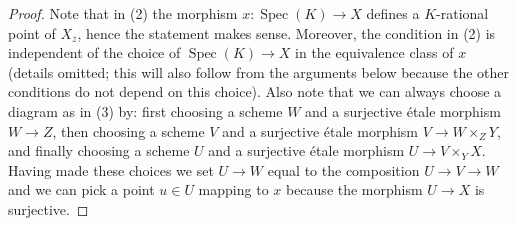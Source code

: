 \documentclass[10pt,a4paper]{amsart}
\theoremstyle{plain}
\theoremstyle{definition}
\theoremstyle{remark}
\numberwithin{equation}{subsection}
\def\Spec{\mathop{\mathrm{Spec}}}
\begin{document}
\begin{proof}
Note that in (2) the morphism $x : \Spec(K) \to X$ defines a
$K$-rational point of $X_z$, hence the statement makes sense. Moreover,
the condition in (2) is independent of the choice of $\Spec(K) \to X$
in the equivalence class of $x$ (details omitted; this will also follow
from the arguments below because the other conditions do not depend
on this choice). Also note that we can always choose a diagram as in
(3) by: first choosing
a scheme $W$ and a surjective \'etale morphism $W \to Z$, then choosing
a scheme $V$ and a surjective \'etale morphism $V \to W \times_Z Y$, and
finally choosing a scheme $U$ and a surjective \'etale morphism
$U \to V \times_Y X$. Having made these choices we set $U \to W$ equal
to the composition $U \to V \to W$ and we can pick a point $u \in U$ mapping
to $x$ because the morphism $U \to X$ is surjective.


\end{proof}
\end{document}
